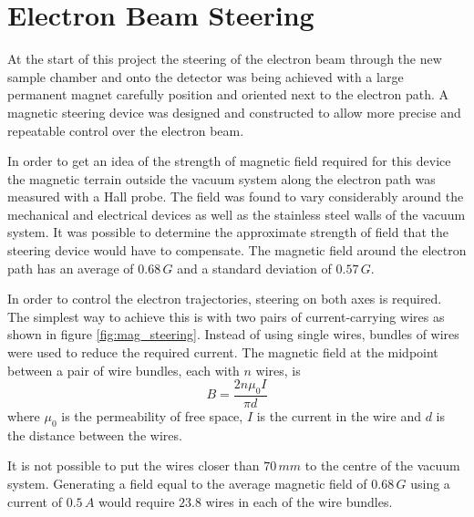 \section{Electron Beam Steering}
At the start of this project the steering of the electron beam through the new sample chamber and onto the detector was being achieved with a large permanent magnet carefully position and oriented next to the electron path. A magnetic steering device was designed and constructed to allow more precise and repeatable control over the electron beam.

In order to get an idea of the strength of magnetic field required for this device the magnetic terrain outside the vacuum system along the electron path was measured with a Hall probe. The field was found to vary considerably around the mechanical and electrical devices as well as the stainless steel walls of the vacuum system. It was possible to determine the approximate strength of field that the steering device would have to compensate. The magnetic field around the electron path has an average of $0.68\,\unit{G}$ and a standard deviation of $0.57\,\unit{G}$.

In order to control the electron trajectories, steering on both axes is required. The simplest way to achieve this is with two pairs of current-carrying wires as shown in figure \ref{fig:mag_steering}. Instead of using single wires, bundles of wires were used to reduce the required current. The magnetic field at the midpoint between a pair of wire bundles, each with $n$ wires, is
\begin{equation}
B=\frac{2n\mu_0I}{\pi d}
\end{equation}
where $\mu_0$ is the permeability of free space, $I$ is the current in the wire and $d$ is the distance between the wires.

It is not possible to put the wires closer than $70\,\unit{mm}$ to the centre of the vacuum system. Generating a field equal to the average magnetic field of $0.68\,\unit{G}$ using a current of $0.5\,\unit{A}$ would require $23.8$ wires in each of the wire bundles.

